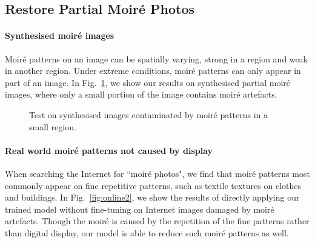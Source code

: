 \documentclass[journal]{IEEEtran}
\begin{document}
\subsection{Restore Partial Moir\'{e} Photos}
\paragraph{Synthesised moir\'{e} images} Moir\'{e} patterns on an image can be spatially varying, strong in a region and weak in another region. Under extreme conditions, moir\'{e} patterns can only appear in part of an image. In Fig.~\ref{fig:partialmoire}, we show our results on synthesised partial moir\'{e} images, where only a small portion of the image contains moir\'{e} artefacts.


\begin{figure}[htb!]
\begin{center}
\end{center}
\caption{Test on synthesised images contaminated by moir\'{e} patterns in a small region. }
\label{fig:partialmoire}
\end{figure}


\paragraph{Real world moir\'{e} patterns not caused by display} When searching the Internet for ``moir\'{e} photos", we find that moir\'{e} patterns most commonly appear on fine repetitive patterns,  such as textile textures on clothes and buildings. In Fig.~\ref{fig:online2}, we show the results of directly applying our trained model without fine-tuning on Internet images damaged by moir\'{e} artefacts.  Though the moir\'{e} is caused by the repetition of the fine patterns rather than digital display, our model is able to reduce such moir\'{e} patterns as well.
\end{document}
